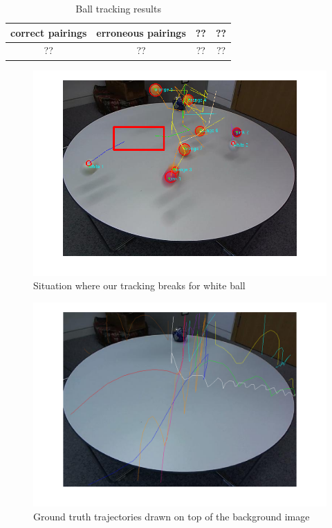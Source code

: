 \documentclass[12pt,a4paper]{article}
\begin{document}
\begin{table}[h]
\centering
\begin{tabular}{@{}cccc@{}}
\toprule
correct pairings & erroneous pairings & ?? & ?? \\ \midrule
??                & ??                    & ??           & ??        \\ \bottomrule
\end{tabular}
\caption{Ball tracking results}
\label{my-label2}
\end{table}

\begin{figure}
	\centering
    \includegraphics[width=140mm]{mistakes/tracking_breaks.png}
    \caption{Situation where our tracking breaks for white ball}
	\label{my-label06}
\end{figure} 


\begin{figure}
	\centering
    \includegraphics[width=140mm]{ground_truth_trajectories.png}
    \caption{Ground truth trajectories drawn on top of the background image}
	\label{my-label05}
\end{figure} 
\end{document}
